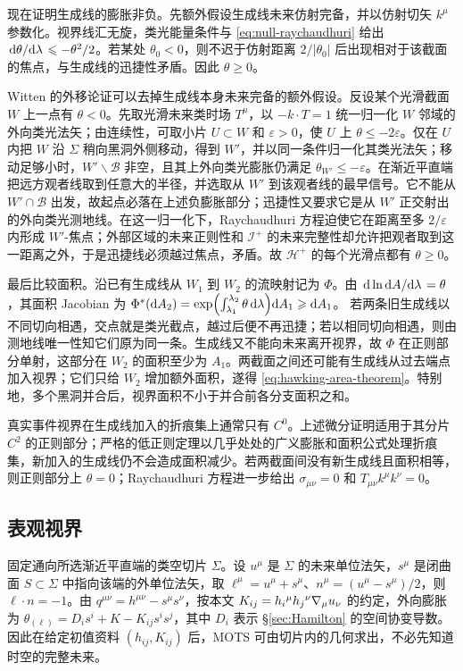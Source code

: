 现在证明生成线的膨胀非负。先额外假设生成线未来仿射完备，并以仿射切矢 $k^\mu$ 参数化。视界线汇无旋，类光能量条件与 \eqref{eq:null-raychaudhuri} 给出 $\dv*{\theta}{\lambda}\leqslant-\theta^2/2$。若某处 $\theta_0<0$，则不迟于仿射距离 $2/|\theta_0|$ 后出现相对于该截面的焦点，与生成线的迅捷性矛盾。因此 $\theta\geqslant0$。

Witten 的外移论证可以去掉生成线本身未来完备的额外假设。反设某个光滑截面 $W$ 上一点有 $\theta<0$。先取光滑未来类时场 $T^\mu$，以 $-k\cdot T=1$ 统一归一化 $W$ 邻域的外向类光法矢；由连续性，可取小片 $U\subset W$ 和 $\varepsilon>0$，使 $U$ 上 $\theta\leqslant-2\varepsilon$。仅在 $U$ 内把 $W$ 沿 $\Sigma$ 稍向黑洞外侧移动，得到 $W'$，并以同一条件归一化其类光法矢；移动足够小时，$W'\backslash\mathcal B$ 非空，且其上外向类光膨胀仍满足 $\theta_{W'}\leqslant-\varepsilon$。在渐近平直端把远方观者线取到任意大的半径，并选取从 $W'$ 到该观者线的最早信号。它不能从 $W'\cap\mathcal B$ 出发，故起点必落在上述负膨胀部分；迅捷性又要求它是从 $W'$ 正交射出的外向类光测地线。在这一归一化下，Raychaudhuri 方程迫使它在距离至多 $2/\varepsilon$ 内形成 $W'$-焦点；外部区域的未来正则性和 $\mathscr I^+$ 的未来完整性却允许把观者取到这一距离之外，于是迅捷线必须越过焦点，矛盾。故 $\mathcal H^+$ 的每个光滑点都有 $\theta\geqslant0$。

最后比较面积。沿已有生成线从 $W_1$ 到 $W_2$ 的流映射记为 $\Phi$。由 $\dv*{\ln\dd A}{\lambda}=\theta$，其面积 Jacobian 为 $\Phi^*(\dd A_2)=\exp(\int_{\lambda_1}^{\lambda_2}\theta\,\dd\lambda)\dd A_1\geqslant\dd A_1$。
若两条旧生成线以不同切向相遇，交点就是类光截点，越过后便不再迅捷；若以相同切向相遇，则由测地线唯一性知它们原为同一条。生成线又不能向未来离开视界，故 $\Phi$ 在正则部分单射，这部分在 $W_2$ 的面积至少为 $A_1$。两截面之间还可能有生成线从过去端点加入视界；它们只给 $W_2$ 增加额外面积，遂得 \eqref{eq:hawking-area-theorem}。特别地，多个黑洞并合后，视界面积不小于并合前各分支面积之和。

真实事件视界在生成线加入的折痕集上通常只有 $C^0$。上述微分证明适用于其分片 $C^2$ 的正则部分；严格的低正则定理以几乎处处的广义膨胀和面积公式处理折痕集，新加入的生成线仍不会造成面积减少。若两截面间没有新生成线且面积相等，则正则部分上 $\theta=0$；Raychaudhuri 方程进一步给出 $\sigma_{\mu\nu}=0$ 和 $T_{\mu\nu}k^\mu k^\nu=0$。

\subsection{表观视界}\label{sec:apparent-horizon}

固定通向所选渐近平直端的类空切片 $\Sigma$。设 $u^\mu$ 是 $\Sigma$ 的未来单位法矢，$s^\mu$ 是闭曲面 $S\subset\Sigma$ 中指向该端的外单位法矢，取 $\ell^\mu=u^\mu+s^\mu$、$n^\mu=(u^\mu-s^\mu)/2$，则 $\ell\cdot n=-1$。由 $q^{\mu\nu}=h^{\mu\nu}-s^\mu s^\nu$，按本文 $K_{ij}=h_i{}^\mu h_j{}^\nu\nabla_\mu u_\nu$ 的约定，外向膨胀为 $\theta_{(\ell)}=D_is^i+K-K_{ij}s^is^j$，其中 $D_i$ 表示 \S\ref{sec:Hamilton} 的空间协变导数。因此在给定初值资料 $(h_{ij},K_{ij})$ 后，MOTS 可由切片内的几何求出，不必先知道时空的完整未来。

